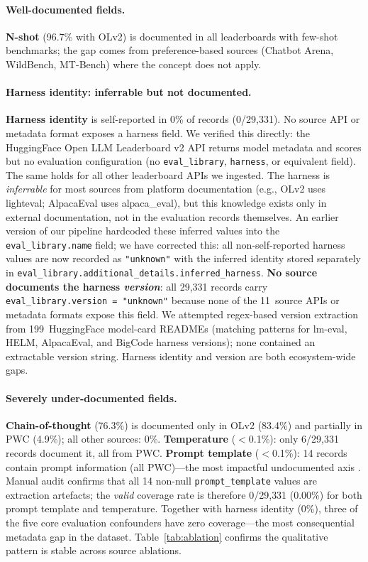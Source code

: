 \documentclass[11pt]{article}
\begin{document}
\paragraph{Well-documented fields.}
\textbf{N-shot} (96.7\% with OLv2) is documented in all
leaderboards with few-shot benchmarks; the gap comes from
preference-based sources (Chatbot Arena, WildBench, MT-Bench)
where the concept does not apply.

\paragraph{Harness identity: inferrable but not documented.}
\textbf{Harness identity} is self-reported in 0\% of
records (0/29{,}331). No
source API or metadata format exposes a harness field. We
verified this directly: the HuggingFace Open LLM Leaderboard
v2 API returns model metadata and scores but no evaluation
configuration (no \texttt{eval\_library}, \texttt{harness}, or
equivalent field). The same holds for all other leaderboard
APIs we ingested. The harness is \emph{inferrable} for most
sources from platform documentation (e.g., OLv2 uses
lighteval; AlpacaEval uses alpaca\_eval), but this knowledge
exists only in external documentation, not in the evaluation
records themselves. An earlier version of our pipeline
hardcoded these inferred values into the
\texttt{eval\_library.name} field; we have corrected this:
all non-self-reported harness values are now recorded as
\texttt{"unknown"} with the inferred identity stored
separately in
\texttt{eval\_library.additional\_details.inferred\_harness}.
\textbf{No source documents the harness \emph{version}}:
all 29{,}331 records carry
\texttt{eval\_library.version = "unknown"} because none of the
11~source APIs or metadata formats expose this field.
We attempted regex-based version extraction from 199~HuggingFace
model-card READMEs (matching patterns for lm-eval, HELM,
AlpacaEval, and BigCode harness versions); none contained an
extractable version string. Harness identity and version are
both ecosystem-wide gaps.

\paragraph{Severely under-documented fields.}
\textbf{Chain-of-thought} (76.3\%) is documented only in OLv2
(83.4\%) and partially in PWC (4.9\%); all other sources: 0\%.
\textbf{Temperature} ($<$0.1\%): only 6/29{,}331 records document
it, all from PWC. \textbf{Prompt template} ($<$0.1\%): 14 records
contain prompt information (all PWC)---the most impactful
undocumented axis \citep{alzahrani-2024-benchmarks}. Manual audit
confirms that all 14 non-null \texttt{prompt\_template} values
are extraction artefacts; the \emph{valid} coverage rate is
therefore 0/29{,}331 (0.00\%) for both prompt template and
temperature. Together with harness identity (0\%),
three of the five core evaluation confounders have
zero coverage---the most consequential metadata
gap in the dataset. Table~\ref{tab:ablation} confirms the
qualitative pattern is stable across source ablations.
\end{document}
